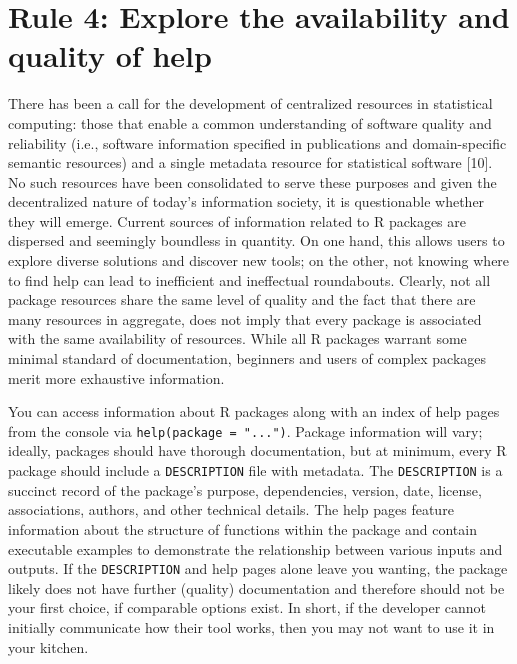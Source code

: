 \documentclass[10pt,letterpaper]{article}
\begin{document}
\hypertarget{rule-4-explore-the-availability-and-quality-of-help}{%
\section{Rule 4: Explore the availability and quality of
help}\label{rule-4-explore-the-availability-and-quality-of-help}}

There has been a call for the development of centralized resources in
statistical computing: those that enable a common understanding of
software quality and reliability (i.e., software information specified
in publications and domain-specific semantic resources) and a single
metadata resource for statistical software {[}10{]}. No such resources
have been consolidated to serve these purposes and given the
decentralized nature of today's information society, it is questionable
whether they will emerge. Current sources of information related to R
packages are dispersed and seemingly boundless in quantity. On one hand,
this allows users to explore diverse solutions and discover new tools;
on the other, not knowing where to find help can lead to inefficient and
ineffectual roundabouts. Clearly, not all package resources share the
same level of quality and the fact that there are many resources in
aggregate, does not imply that every package is associated with the same
availability of resources. While all R packages warrant some minimal
standard of documentation, beginners and users of complex packages merit
more exhaustive information.

You can access information about R packages along with an index of help
pages from the console via \texttt{help(package\ =\ "...")}. Package
information will vary; ideally, packages should have thorough
documentation, but at minimum, every R package should include a
\texttt{DESCRIPTION} file with metadata. The \texttt{DESCRIPTION} is a
succinct record of the package's purpose, dependencies, version, date,
license, associations, authors, and other technical details. The help
pages feature information about the structure of functions within the
package and contain executable examples to demonstrate the relationship
between various inputs and outputs. If the \texttt{DESCRIPTION} and help
pages alone leave you wanting, the package likely does not have further
(quality) documentation and therefore should not be your first choice,
if comparable options exist. In short, if the developer cannot initially
communicate how their tool works, then you may not want to use it in
your kitchen.
\end{document}
